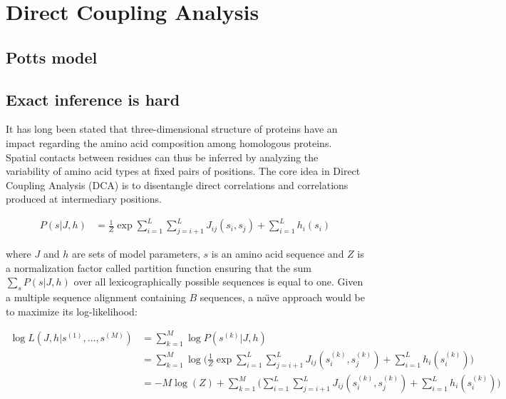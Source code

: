 \section{Direct Coupling Analysis}

    \subsection{Potts model} \label{potts}

    \subsection{Exact inference is hard}

        It has long been stated that three-dimensional structure of proteins have an impact regarding the amino acid composition among
        homologous proteins. Spatial contacts between residues can thus be inferred by analyzing the variability of amino acid types at fixed pairs of positions.
        The core idea in Direct Coupling Analysis (DCA) is to disentangle direct correlations and correlations produced at intermediary positions.

        \begin{equation}
            \begin{split}
                P(s \vert J, h) & = \frac{1}{Z} \exp{\sum\limits_{i=1}^L \sum\limits_{j=i+1}^L J_{ij}(s_i, s_j) + \sum\limits_{i=1}^L h_i(s_i)}
            \end{split}
        \end{equation}

        where $J$ and $h$ are sets of model parameters, $s$ is an amino acid sequence and $Z$ is a normalization factor called partition function ensuring
        that the sum $\sum\limits_{s} P(s \vert J, h)$ over all lexicographically possible sequences is equal to one.
        Given a multiple sequence alignment containing $B$ sequences, a na\"\i ve approach would be to maximize its log-likelihood:

        \begin{equation}
            \begin{split}
                \log{L}(J, h \vert s^{(1)}, \dotsc, s^{(M)}) & = \sum\limits_{k=1}^M \log P(s^{(k)} \vert J, h) \\
                & = \sum\limits_{k=1}^M \log \Bigg( \frac{1}{Z} \exp{\sum\limits_{i=1}^L 
                    \sum\limits_{j=i+1}^L J_{ij}(s_i^{(k)}, s_j^{(k)}) + \sum\limits_{i=1}^L h_i(s_i^{(k)})} \Bigg) \\
                & = -M \log(Z) + \sum\limits_{k=1}^M \Big( \sum\limits_{i=1}^L \sum\limits_{j=i+1}^L J_{ij}(s_i^{(k)}, s_j^{(k)}) 
                    + \sum\limits_{i=1}^L h_i(s_i^{(k)}) \Big)
            \end{split}
        \end{equation}

